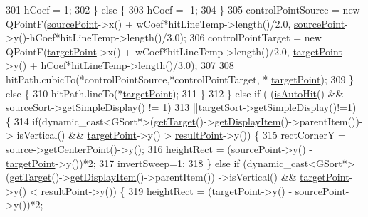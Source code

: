 \begin{DoxyCode}
301                 hCoef = 1;
302             \} \textcolor{keywordflow}{else} \{
303                 hCoef = -1;
304             \}
305             controlPointSource = \textcolor{keyword}{new} QPointF(\hyperlink{classGAction_adf67bcd561238d7626566cebeee2a151}{sourcePoint}->x() + wCoef*hitLineTemp->length()/2.0,
      \hyperlink{classGAction_adf67bcd561238d7626566cebeee2a151}{sourcePoint}->y()-hCoef*hitLineTemp->length()/3.0);
306             controlPointTarget = \textcolor{keyword}{new} QPointF(\hyperlink{classGAction_ad6992ac8b540932c370f5b46c48bbe70}{targetPoint}->x() + wCoef*hitLineTemp->length()/2.0,
      \hyperlink{classGAction_ad6992ac8b540932c370f5b46c48bbe70}{targetPoint}->y() + hCoef*hitLineTemp->length()/3.0);
307 
308             hitPath.cubicTo(*controlPointSource,*controlPointTarget, *
      \hyperlink{classGAction_ad6992ac8b540932c370f5b46c48bbe70}{targetPoint});
309         \} \textcolor{keywordflow}{else} \{
310             hitPath.lineTo(*\hyperlink{classGAction_ad6992ac8b540932c370f5b46c48bbe70}{targetPoint});
311         \}
312     \} \textcolor{keywordflow}{else} \textcolor{keywordflow}{if} ( (\hyperlink{classGAction_aa03acf91fcd0c6b8eaa4fb5e610e83e5}{isAutoHit}() && sourceSort->getSimpleDisplay() != 1)
313                 ||targetSort->getSimpleDisplay()!=1) \{
314         \textcolor{keywordflow}{if}(dynamic\_cast<GSort*>(\hyperlink{classGAction_ac7aff6bc03be3791a8a20a914aae5b2c}{getTarget}()->\hyperlink{classGAction_a5092e3c2bbdd70a63c914766c0142672}{getDisplayItem}()->parentItem())->
      isVertical() && \hyperlink{classGAction_ad6992ac8b540932c370f5b46c48bbe70}{targetPoint}->y() > \hyperlink{classGAction_a08d6b4a2f2d04a46861dafbe38897d8a}{resultPoint}->y()) \{
315             rectCornerY = source->getCenterPoint()->y();
316             heightRect = (\hyperlink{classGAction_adf67bcd561238d7626566cebeee2a151}{sourcePoint}->y() - \hyperlink{classGAction_ad6992ac8b540932c370f5b46c48bbe70}{targetPoint}->y())*2;
317             invertSweep=1;
318         \} \textcolor{keywordflow}{else} \textcolor{keywordflow}{if} (dynamic\_cast<GSort*>(\hyperlink{classGAction_ac7aff6bc03be3791a8a20a914aae5b2c}{getTarget}()->\hyperlink{classGAction_a5092e3c2bbdd70a63c914766c0142672}{getDisplayItem}()->parentItem())
      ->isVertical() && \hyperlink{classGAction_ad6992ac8b540932c370f5b46c48bbe70}{targetPoint}->y() < \hyperlink{classGAction_a08d6b4a2f2d04a46861dafbe38897d8a}{resultPoint}->y()) \{
319             heightRect = (\hyperlink{classGAction_ad6992ac8b540932c370f5b46c48bbe70}{targetPoint}->y() - \hyperlink{classGAction_adf67bcd561238d7626566cebeee2a151}{sourcePoint}->y())*2;

\end{DoxyCode}
